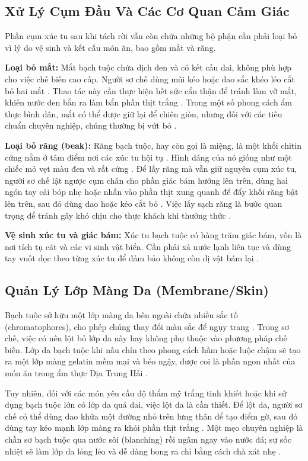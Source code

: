 \documentclass[12pt,a4paper]{report}
\begin{document}
\subsection{Xử Lý Cụm Đầu Và Các Cơ Quan Cảm Giác}

Phần cụm xúc tu sau khi tách rời vẫn còn chứa những bộ phận cần phải loại bỏ vì lý do vệ sinh và kết cấu món ăn, bao gồm mắt và răng.

\textbf{Loại bỏ mắt:} Mắt bạch tuộc chứa dịch đen và có kết cấu dai, không phù hợp cho việc chế biến cao cấp. Người sơ chế dùng mũi kéo hoặc dao sắc khéo léo cắt bỏ hai mắt \cite{ref3}. Thao tác này cần thực hiện hết sức cẩn thận để tránh làm vỡ mắt, khiến nước đen bắn ra làm bẩn phần thịt trắng \cite{ref3}. Trong một số phong cách ẩm thực bình dân, mắt có thể được giữ lại để chiên giòn, nhưng đối với các tiêu chuẩn chuyên nghiệp, chúng thường bị vứt bỏ \cite{ref20}.

\textbf{Loại bỏ răng (beak):} Răng bạch tuộc, hay còn gọi là miệng, là một khối chitin cứng nằm ở tâm điểm nơi các xúc tu hội tụ \cite{ref7}. Hình dáng của nó giống như một chiếc mỏ vẹt màu đen và rất cứng \cite{ref7}. Để lấy răng mà vẫn giữ nguyên cụm xúc tu, người sơ chế lật ngược cụm chân cho phần giác bám hướng lên trên, dùng hai ngón tay cái bóp nhẹ hoặc nhấn vào phần thịt xung quanh để đẩy khối răng bật lên trên, sau đó dùng dao hoặc kéo cắt bỏ \cite{ref1}. Việc lấy sạch răng là bước quan trọng để tránh gây khó chịu cho thực khách khi thưởng thức \cite{ref20}.

\textbf{Vệ sinh xúc tu và giác bám:} Xúc tu bạch tuộc có hàng trăm giác bám, vốn là nơi tích tụ cát và các vi sinh vật biển. Cần phải xả nước lạnh liên tục và dùng tay vuốt dọc theo từng xúc tu để đảm bảo không còn dị vật bám lại \cite{ref13}.

\subsection{Quản Lý Lớp Màng Da (Membrane/Skin)}

Bạch tuộc sở hữu một lớp màng da bên ngoài chứa nhiều sắc tố (chromatophores), cho phép chúng thay đổi màu sắc để ngụy trang \cite{ref7}. Trong sơ chế, việc có nên lột bỏ lớp da này hay không phụ thuộc vào phương pháp chế biến. Lớp da bạch tuộc khi nấu chín theo phong cách hầm hoặc luộc chậm sẽ tạo ra một lớp màng gelatin mềm mại và béo ngậy, được coi là phần ngon nhất của món ăn trong ẩm thực Địa Trung Hải \cite{ref25}.

Tuy nhiên, đối với các món yêu cầu độ thẩm mỹ trắng tinh khiết hoặc khi sử dụng bạch tuộc lớn có lớp da quá dai, việc lột da là cần thiết. Để lột da, người sơ chế có thể dùng dao khứa một đường nhỏ trên lưng thân để tạo điểm gờ, sau đó dùng tay kéo mạnh lớp màng ra khỏi phần thịt trắng \cite{ref1}. Một mẹo chuyên nghiệp là chần sơ bạch tuộc qua nước sôi (blanching) rồi ngâm ngay vào nước đá; sự sốc nhiệt sẽ làm lớp da lỏng lẻo và dễ dàng bong ra chỉ bằng cách chà xát nhẹ \cite{ref18}.
\end{document}
